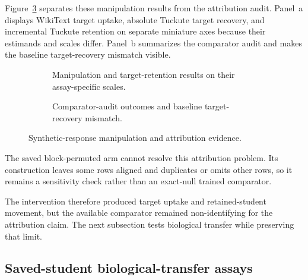 Figure~\ref{fig:synthetic-manipulation-attribution} separates these manipulation results from the attribution audit.
Panel~a displays WikiText target uptake, absolute Tuckute target recovery, and incremental Tuckute retention on separate miniature axes because their estimands and scales differ.
Panel~b summarizes the comparator audit and makes the baseline target-recovery mismatch visible.

\begin{figure}[H]
  \centering
  \begin{subfigure}[t]{\textwidth}
    \centering
    \resizebox{\linewidth}{!}{}
    \par\smallskip
    \caption{Manipulation and target-retention results on their assay-specific scales.}
    \label{fig:synthetic-manipulation-results}
  \end{subfigure}
  \par\smallskip
  \begin{subfigure}[t]{\textwidth}
    \centering
    \resizebox{\linewidth}{!}{}
    \par\smallskip
    \caption{Comparator-audit outcomes and baseline target-recovery mismatch.}
    \label{fig:synthetic-comparator-audit}
  \end{subfigure}
  \caption{Synthetic-response manipulation and attribution evidence.}
  \label{fig:synthetic-manipulation-attribution}
\end{figure}
\FloatBarrier

The saved block-permuted arm cannot resolve this attribution problem.
Its construction leaves some rows aligned and duplicates or omits other rows, so it remains a sensitivity check rather than an exact-null trained comparator. 

The intervention therefore produced target uptake and retained-student movement, but the available comparator remained non-identifying for the attribution claim.
The next subsection tests biological transfer while preserving that limit.

\subsection{Saved-student biological-transfer assays}
\label{sec:results-predicted-transfer}

